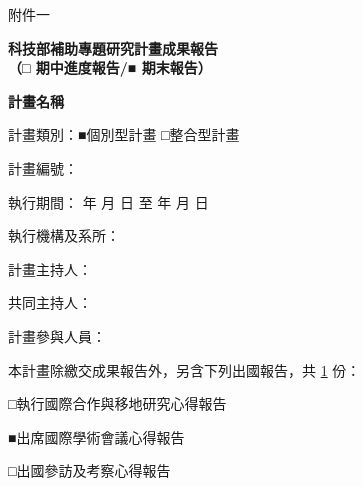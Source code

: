 \documentclass[12pt]{article}
\begin{document}
\begin{CJK}{UTF8}{}%
\vspace*{-1cm}
\noindent 附件一
\vspace*{1cm}

\begin{center}

{\bf \Large  科技部補助專題研究計畫成果報告 \\
（□ 期中進度報告/■ 期末報告）} 

\vspace{1.cm}
{\bf \Large  計畫名稱 }
\end{center}
\vspace{1.cm}

計畫類別：■個別型計畫   □整合型計畫 

計畫編號：  

執行期間：  年 月 日 至 年 月 日

\vspace{1cm}
執行機構及系所：

\vspace{1cm}
計畫主持人：

共同主持人：

計畫參與人員： 

\vspace{1.3cm}
本計畫除繳交成果報告外，另含下列出國報告，共 \underline{1} 份：

□執行國際合作與移地研究心得報告

■出席國際學術會議心得報告

□出國參訪及考察心得報告
\vspace{1.3cm}

%  
%  
%
%  

\vspace{\fill}
\begin{center}
\end{center}


\end{CJK}
\end{document}
